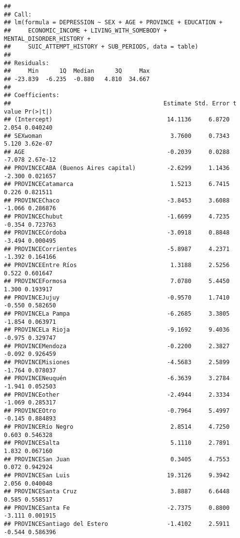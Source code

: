 \documentclass[
]{book}
\begin{document}
\begin{verbatim}
## 
## Call:
## lm(formula = DEPRESSION ~ SEX + AGE + PROVINCE + EDUCATION + 
##     ECONOMIC_INCOME + LIVING_WITH_SOMEBODY + MENTAL_DISORDER_HISTORY + 
##     SUIC_ATTEMPT_HISTORY + SUB_PERIODS, data = table)
## 
## Residuals:
##     Min      1Q  Median      3Q     Max 
## -23.839  -6.235  -0.880   4.810  34.667 
## 
## Coefficients:
##                                            Estimate Std. Error t value Pr(>|t|)
## (Intercept)                                 14.1136     6.8720   2.054 0.040240
## SEXwoman                                     3.7600     0.7343   5.120 3.62e-07
## AGE                                         -0.2039     0.0288  -7.078 2.67e-12
## PROVINCECABA (Buenos Aires capital)         -2.6299     1.1436  -2.300 0.021657
## PROVINCECatamarca                            1.5213     6.7415   0.226 0.821511
## PROVINCEChaco                               -3.8453     3.6088  -1.066 0.286876
## PROVINCEChubut                              -1.6699     4.7235  -0.354 0.723763
## PROVINCECórdoba                             -3.0918     0.8848  -3.494 0.000495
## PROVINCECorrientes                          -5.8987     4.2371  -1.392 0.164166
## PROVINCEEntre Ríos                           1.3188     2.5256   0.522 0.601647
## PROVINCEFormosa                              7.0780     5.4450   1.300 0.193917
## PROVINCEJujuy                               -0.9570     1.7410  -0.550 0.582650
## PROVINCELa Pampa                            -6.2685     3.3805  -1.854 0.063971
## PROVINCELa Rioja                            -9.1692     9.4036  -0.975 0.329747
## PROVINCEMendoza                             -0.2200     2.3827  -0.092 0.926459
## PROVINCEMisiones                            -4.5683     2.5899  -1.764 0.078037
## PROVINCENeuquén                             -6.3639     3.2784  -1.941 0.052503
## PROVINCEother                               -2.4944     2.3334  -1.069 0.285317
## PROVINCEOtro                                -0.7964     5.4997  -0.145 0.884893
## PROVINCERío Negro                            2.8514     4.7250   0.603 0.546328
## PROVINCESalta                                5.1110     2.7891   1.832 0.067160
## PROVINCESan Juan                             0.3405     4.7553   0.072 0.942924
## PROVINCESan Luis                            19.3126     9.3942   2.056 0.040048
## PROVINCESanta Cruz                           3.8887     6.6448   0.585 0.558517
## PROVINCESanta Fe                            -2.7375     0.8800  -3.111 0.001915
## PROVINCESantiago del Estero                 -1.4102     2.5911  -0.544 0.586396

\end{verbatim}
\end{document}
